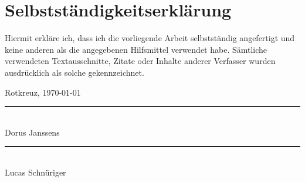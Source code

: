 \section*{Selbstständigkeitserklärung}
Hiermit erkläre ich, dass ich die vorliegende Arbeit selbstständig angefertigt und keine anderen als die angegebenen Hilfsmittel verwendet habe. Sämtliche verwendeten Textausschnitte, Zitate oder Inhalte anderer Verfasser wurden ausdrücklich als solche gekennzeichnet.

\vspace{1cm}

Rotkreuz, \today %

\vspace{2cm}

\parbox{\textwidth}{
  \parbox{7cm}{
    \rule{6cm}{.5pt}\\
    Dorus Janssens
  }
  \hfill
  \parbox{7cm}{
    \rule{6cm}{.5pt}\\
    Lucas Schnüriger
  }
}
